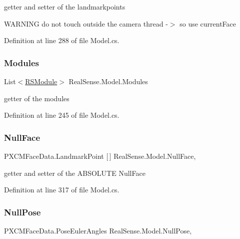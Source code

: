getter and setter of the landmarkpoints

W\+A\+R\+N\+I\+NG do not touch outside the camera thread -\/$>$ so use current\+Face 

Definition at line 288 of file Model.\+cs.

\mbox{\label{class_real_sense_1_1_model_a9664e53331481e9cc45ad6d3540c218c}} 
\subsubsection{\texorpdfstring{Modules}{Modules}}
{\footnotesize\ttfamily List$<$\hyperlink{class_real_sense_1_1_r_s_module}{R\+S\+Module}$>$ Real\+Sense.\+Model.\+Modules\hspace{0.3cm}{\ttfamily [get]}}

getter of the modules 

Definition at line 245 of file Model.\+cs.

\mbox{\label{class_real_sense_1_1_model_af626df64a18cb2fcf4cbc06ffbadfa17}} 
\subsubsection{\texorpdfstring{Null\+Face}{NullFace}}
{\footnotesize\ttfamily P\+X\+C\+M\+Face\+Data.\+Landmark\+Point \mbox{[}$\,$\mbox{]} Real\+Sense.\+Model.\+Null\+Face\hspace{0.3cm}{\ttfamily [get]}, {\ttfamily [set]}}

getter and setter of the A\+B\+S\+O\+L\+U\+TE Null\+Face 

Definition at line 317 of file Model.\+cs.

\mbox{\label{class_real_sense_1_1_model_af6cb31aea9e1e0fd3ef87c9380e92193}} 
\subsubsection{\texorpdfstring{Null\+Pose}{NullPose}}
{\footnotesize\ttfamily P\+X\+C\+M\+Face\+Data.\+Pose\+Euler\+Angles Real\+Sense.\+Model.\+Null\+Pose\hspace{0.3cm}{\ttfamily [get]}, {\ttfamily [set]}}

